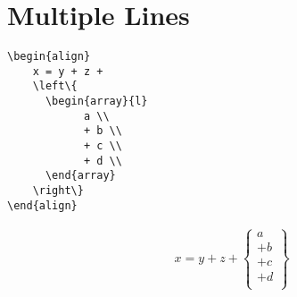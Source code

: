 \documentclass[12pt,english]{article}
\begin{document}
\pagebreak

\section{Multiple Lines}

\begin{verbatim}
\begin{align}
    x = y + z +
    \left\{
      \begin{array}{l}
            a \\
            + b \\
            + c \\
            + d \\
      \end{array}
    \right\}
\end{align}
\end{verbatim}

\begin{align}
    x = y + z +
    \left\{
      \begin{array}{l}
            a \\
            + b \\
            + c \\
            + d \\
      \end{array}
    \right\}
\end{align}
\end{document}
